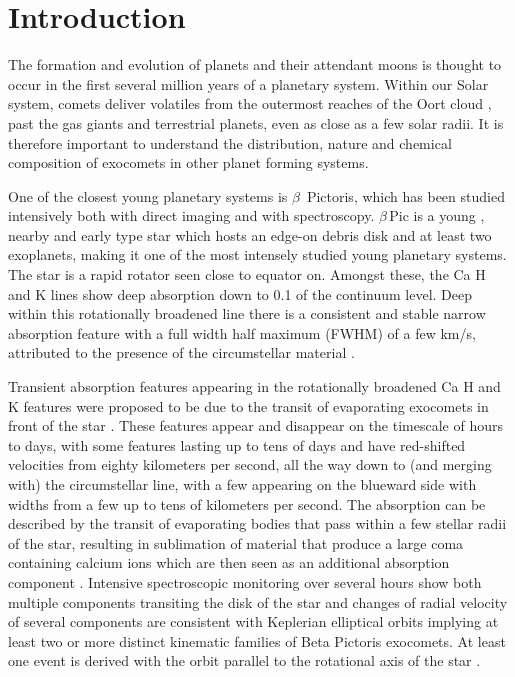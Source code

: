 \documentclass{aa}
\newcommand{\kms}{km s$^{-1}$}
\newcommand{\bp}{$\beta$\,Pic}
\begin{document}

   \maketitle

\section{Introduction}

The formation and evolution of planets and their attendant moons is thought to occur in the first several million years of a planetary system.
%
Within our Solar system, comets deliver volatiles from the outermost reaches of the Oort cloud \citep{Obrien2018}, past the gas giants and terrestrial planets, even as close as a few solar radii.
%
It is therefore important to understand the distribution, nature and chemical composition of exocomets in other planet forming systems.

One of the closest young planetary systems is $\beta$~Pictoris, which has been studied intensively both with direct imaging and with spectroscopy.
%
\bp{} is a young \citep[$\sim 25$ Myr; see ][ for discussions]{Lee24}, nearby \citep[$19.63\pm 0.06$ pc, ][]{Lindegren21} and early type star \citep[A6V; ][]{Gray06} which hosts an edge-on debris disk and at least two exoplanets, making it one of the most intensely studied young planetary systems.
%
The star is a rapid rotator \citep[$124\pm 3$\,\kms{}; ][]{Koen03} seen close to equator on.
%
Amongst these, the Ca H and K lines show deep absorption down to 0.1 of the continuum level.
%
Deep within this rotationally broadened line there is a consistent and stable narrow absorption feature with a full width half maximum (FWHM) of a few km/s, attributed to the presence of the circumstellar material \citep{Hobbs85,VidalMadjar86}.

Transient absorption features appearing in the rotationally broadened Ca H and K features were proposed to be due to the transit of evaporating exocomets in front of the star \citep{Ferlet87}.
%
These features appear and disappear on the timescale of hours to days, with some features lasting up to tens of days and have red-shifted velocities from eighty kilometers per second, all the way down to (and merging with) the circumstellar line, with a few appearing on the blueward side \citep{LagrangeHenri92} with widths from a few up to tens of kilometers per second.
%
The absorption can be described by the transit of evaporating bodies that pass within a few stellar radii of the star, resulting in sublimation of material that produce a large coma containing calcium ions which are then seen as an additional absorption component \citep{Beust91}.
%
Intensive spectroscopic monitoring over several hours show both multiple components transiting the disk of the star \citep{Beust96} and changes of radial velocity of several components are consistent with Keplerian elliptical orbits \citep{Kennedy18} implying at least two \citep{Kiefer14,Pollard24} or more \citep{Heller24} distinct kinematic families of Beta Pictoris exocomets.
%
At least one event is derived with the orbit parallel to the rotational axis of the star \citep{Tobin19}.
\end{document}
